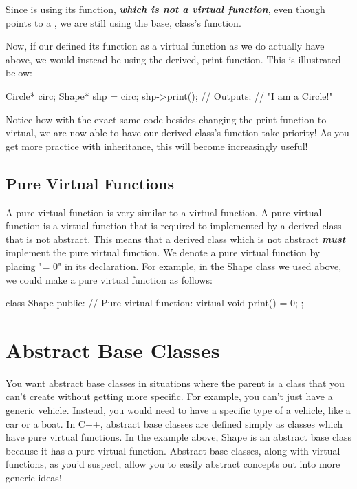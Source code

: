 \documentclass{tufte-handout}
\begin{document}
Since  is using its  function, \textit{\textbf{which is not a virtual function}}, even though  points to a , we are still using the base,  class's  function.

Now, if our  defined its  function as a virtual function as we do actually have above, we would instead be using the derived,  print function.
This is illustrated below:

\begin{Code}
    Circle* circ;
    Shape* shp = circ;
    shp->print();
    // Outputs:
    // "I am a Circle!"
\end{Code}
Notice how with the exact same code besides changing the print function to virtual, we are now able to have our derived class's function take priority!
As you get more practice with inheritance, this will become increasingly useful!

\subsection{Pure Virtual Functions}
A pure virtual function is very similar to a virtual function.
A pure virtual function is a virtual function that is required to implemented by a derived class that is not abstract.
This means that a derived class which is not abstract \textbf{\textit{must}} implement the pure virtual function. We denote a pure virtual function by placing "= 0" in its declaration. For example, in the Shape class we used above, we could make  a pure virtual function as follows:
\begin{Code}
class Shape{
    public:
        // Pure virtual function:
        virtual void print() = 0;
};
\end{Code}

\section{Abstract Base Classes}
You want abstract base classes in situations where the parent is a class that you can't create without getting more specific.
For example, you can't just have a generic vehicle.
Instead, you would need to have a specific type of a vehicle, like a car or a boat.
In C++, abstract base classes are defined simply as classes which have pure virtual functions.
In the example above, Shape is an abstract base class because it has a pure virtual function.
Abstract base classes, along with virtual functions, as you'd suspect, allow you to easily abstract concepts out into more generic ideas!
\end{document}
